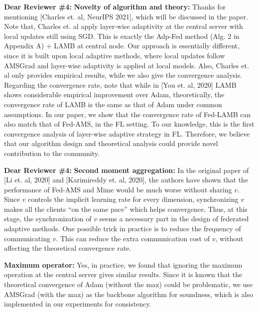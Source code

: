 \documentclass{article}
\begin{document}
{\color{blue} \textbf{Dear Reviewer \#4:}} \textbf{Novelty of algorithm and theory:} Thanks for mentioning [Charles et. al, NeurIPS 2021], which will be discussed in the paper. Note that, Charles et. al apply layer-wise adaptivity at the central server with local updates still using SGD. This is exactly the Adp-Fed method (Alg. 2 in Appendix A) + LAMB at central node. Our approach is essentially different, since it is built upon local adaptive methods, where local updates follow AMSGrad and layer-wise adaptivity is applied at local models. Also, Charles et. al only provides empirical results, while we also give the convergence analysis. Regarding the convergence rate, note that while in [You et. al, 2020] LAMB shows considerable empirical improvement over Adam, theoretically, the convergence rate of LAMB is the same as that of Adam under common assumptions. In our paper, we show that the convergence rate of Fed-LAMB can also match that of Fed-AMS, in the FL setting. To our knowledge, this is the first convergence analysis of layer-wise adaptive strategy in FL. Therefore, we believe that our algorithm design and theoretical analysis could provide novel contribution to the community.



{\color{blue} \textbf{Dear Reviewer \#4:}} \textbf{Second moment aggregation:} In the original paper of [Li et. al, 2020] and [Karimireddy et. al, 2020], the authors have shown that the performance of Fed-AMS and Mime would be much worse without sharing $v$. Since $v$ controls the implicit learning rate for every dimension, synchronizing $v$ makes all the clients ``on the same pace'' which helps convergence. Thus, at this stage, the synchronization of $v$ seems a necessary part in the design of federated adaptive methods. One possible trick in practice is to reduce the frequency of communicating $v$. This can reduce the extra communication cost of $v$, without affecting the theoretical convergence rate.

\textbf{Maximum operator:} Yes, in practice, we found that ignoring the maximum operation at the central server gives similar results. Since it is known that the theoretical convergence of Adam (without the max) could be problematic, we use AMSGrad (with the max) as the backbone algorithm for soundness, which is also implemented in our experiments for consistency.
\end{document}
